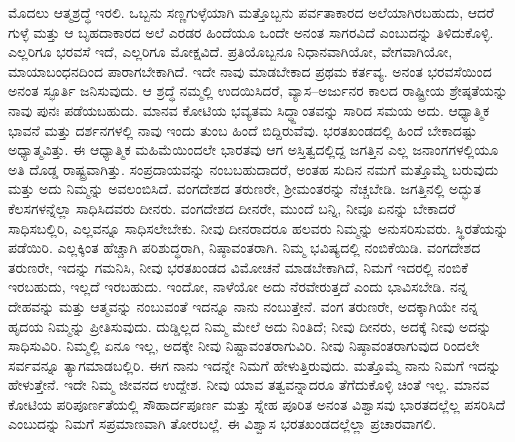 ಮೊದಲು ಆತ್ಮಶ್ರದ್ಧೆ ಇರಲಿ. ಒಬ್ಬನು ಸಣ್ಣಗುಳ್ಳೆಯಾಗಿ ಮತ್ತೊಬ್ಬನು ಪರ್ವತಾಕಾರದ ಅಲೆಯಾಗಿರಬಹುದು, ಆದರೆ ಗುಳ್ಳೆ ಮತ್ತು ಆ ಬೃಹದಾಕಾರದ ಅಲೆ ಎರಡರ ಹಿಂದೆಯೂ ಒಂದೇ ಅನಂತ ಸಾಗರವಿದೆ ಎಂಬುದನ್ನು ತಿಳಿದುಕೊಳ್ಳಿ. ಎಲ್ಲರಿಗೂ ಭರವಸೆ ಇದೆ, ಎಲ್ಲರಿಗೂ ಮೋಕ್ಷವಿದೆ. ಪ್ರತಿಯೊಬ್ಬನೂ ನಿಧಾನವಾಗಿಯೋ, ವೇಗವಾಗಿಯೋ, ಮಾಯಾಬಂಧನದಿಂದ ಪಾರಾಗಬೇಕಾಗಿದೆ. ಇದೇ ನಾವು ಮಾಡಬೇಕಾದ ಪ್ರಥಮ ಕರ್ತವ್ಯ. ಅನಂತ ಭರವಸೆಯಿಂದ ಅನಂತ ಸ್ಫೂರ್ತಿ ಜನಿಸುವುದು. ಆ ಶ್ರದ್ಧೆ ನಮ್ಮಲ್ಲಿ ಉದಯಿಸಿದರೆ, ವ್ಯಾಸ–ಅರ್ಜುನರ ಕಾಲದ ರಾಷ್ಟ್ರೀಯ ಶ್ರೇಷ್ಠತೆಯನ್ನು ನಾವು ಪುನಃ ಪಡೆಯಬಹುದು. ಮಾನವ ಕೋಟಿಯ ಭವ್ಯತಮ ಸಿದ್ಧ್ದಾಂತವನ್ನು ಸಾರಿದ ಸಮಯ ಅದು. ಆಧ್ಯಾತ್ಮಿಕ ಭಾವನೆ ಮತ್ತು ದರ್ಶನಗಳಲ್ಲಿ ನಾವು ಇಂದು ತುಂಬ ಹಿಂದೆ ಬಿದ್ದಿರುವೆವು. ಭರತಖಂಡದಲ್ಲಿ ಹಿಂದೆ ಬೇಕಾದಷ್ಟು ಅಧ್ಯಾತ್ಮವಿತ್ತು. ಈ ಆಧ್ಯಾತ್ಮಿಕ ಮಹಿಮೆಯಿಂದಲೇ ಭಾರತವು ಆಗ ಅಸ್ತಿತ್ವದಲ್ಲಿದ್ದ ಜಗತ್ತಿನ ಎಲ್ಲ ಜನಾಂಗಗಳಲ್ಲಿಯೂ ಅತಿ ದೊಡ್ಡ ರಾಷ್ಟ್ರವಾಗಿತ್ತು. ಸಂಪ್ರದಾಯವನ್ನು ನಂಬಬಹುದಾದರೆ, ಅಂತಹ ಸುದಿನ ನಮಗೆ ಮತ್ತೊಮ್ಮೆ ಬರುವುದು ಮತ್ತು ಅದು ನಿಮ್ಮನ್ನು ಅವಲಂಬಿಸಿದೆ. ವಂಗದೇಶದ ತರುಣರೇ, ಶ‍್ರೀಮಂತರನ್ನು ನೆಚ್ಚಬೇಡಿ. ಜಗತ್ತಿನಲ್ಲಿ ಅದ್ಭುತ ಕೆಲಸಗಳನ್ನೆಲ್ಲಾ ಸಾಧಿಸಿದವರು ದೀನರು. ವಂಗದೇಶದ ದೀನರೇ, ಮುಂದೆ ಬನ್ನಿ, ನೀವೂ ಏನನ್ನು ಬೇಕಾದರೆ ಸಾಧಿಸಬಲ್ಲಿರಿ, ಎಲ್ಲವನ್ನೂ ಸಾಧಿಸಲೇಬೇಕು. ನೀವು ದೀನರಾದರೂ ಹಲವರು ನಿಮ್ಮನ್ನು ಅನುಸರಿಸುವರು. ಸ್ಥಿರತೆಯನ್ನು ಪಡೆಯಿರಿ. ಎಲ್ಲಕ್ಕಿಂತ ಹೆಚ್ಚಾಗಿ ಪರಿಶುದ್ಧರಾಗಿ, ನಿಷ್ಠಾವಂತರಾಗಿ. ನಿಮ್ಮ ಭವಿಷ್ಯದಲ್ಲಿ ನಂಬಿಕೆಯಿಡಿ. ವಂಗದೇಶದ ತರುಣರೇ, ಇದನ್ನು ಗಮನಿಸಿ, ನೀವು ಭರತಖಂಡದ ವಿಮೋಚನೆ ಮಾಡಬೇಕಾಗಿದೆ, ನಿಮಗೆ ಇದರಲ್ಲಿ ನಂಬಿಕೆ ಇರಬಹುದು, ಇಲ್ಲದೆ ಇರಬಹುದು. ಇಂದೋ, ನಾಳೆಯೋ ಅದು ನೆರವೇರುತ್ತದೆ ಎಂದು ಭಾವಿಸಬೇಡಿ. ನನ್ನ ದೇಹವನ್ನು ಮತ್ತು ಆತ್ಮವನ್ನು ನಂಬುವಂತೆ ಇದನ್ನೂ ನಾನು ನಂಬುತ್ತೇನೆ. ವಂಗ ತರುಣರೇ, ಅದಕ್ಕಾಗಿಯೇ ನನ್ನ ಹೃದಯ ನಿಮ್ಮನ್ನು ಪ್ರೀತಿಸುವುದು. ದುಡ್ಡಿಲ್ಲದ ನಿಮ್ಮ ಮೇಲೆ ಅದು ನಿಂತಿದೆ; ನೀವು ದೀನರು, ಅದಕ್ಕೆ ನೀವು ಅದನ್ನು ಸಾಧಿಸುವಿರಿ. ನಿಮ್ಮಲ್ಲಿ ಏನೂ ಇಲ್ಲ, ಅದಕ್ಕೇ ನೀವು ನಿಷ್ಟಾವಂತರಾಗುವಿರಿ. ನೀವು ನಿಷ್ಠಾವಂತರಾಗುವುದ ರಿಂದಲೇ ಸರ್ವವನ್ನೂ ತ್ಯಾಗಮಾಡಬಲ್ಲಿರಿ. ಈಗ ನಾನು ಇದನ್ನೇ ನಿಮಗೆ ಹೇಳುತ್ತಿರುವುದು. ಮತ್ತೊಮ್ಮೆ ನಾನು ನಿಮಗೆ ಇದನ್ನು ಹೇಳುತ್ತೇನೆ. ಇದೇ ನಿಮ್ಮ ಜೀವನದ ಉದ್ದೇಶ. ನೀವು ಯಾವ ತತ್ವವನ್ನಾದರೂ ತೆಗೆದುಕೊಳ್ಳಿ ಚಿಂತೆ ಇಲ್ಲ. ಮಾನವ ಕೋಟಿಯ ಪರಿಪೂರ್ಣತೆಯಲ್ಲಿ ಸೌಹಾರ್ದಪೂರ್ಣ ಮತ್ತು ಸ್ನೇಹ ಪೂರಿತ ಅನಂತ ವಿಶ್ವಾಸವು ಭಾರತದಲ್ಲೆಲ್ಲ ಪಸರಿಸಿದೆ ಎಂಬುದನ್ನು ನಿಮಗೆ ಸಪ್ರಮಾಣವಾಗಿ ತೋರಬಲ್ಲೆ. ಈ ವಿಶ್ವಾಸ ಭರತಖಂಡದಲ್ಲೆಲ್ಲಾ ಪ್ರಚಾರವಾಗಲಿ. 


